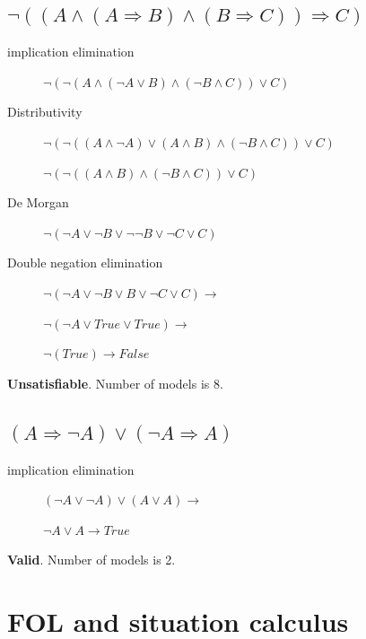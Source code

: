 \documentclass{article}                     %
\newcommand{\nt}[1]{\neg #1}
\begin{document}
	\subsection{$ \neg ((A \land (A \Rightarrow B) \land (B \Rightarrow C)) \Rightarrow C )$}
	\begin{description}
		\item[implication elimination] 	$ \neg (\neg(A \land (\nt{A} \lor B) \land (\nt{B} \land C)) \lor C )$
		\item[Distributivity]  $ \neg (\neg((A \land \nt{A}) \lor (A \land B) \land (\nt{B} \land C)) \lor C )$
		
		$ \neg (\neg((A \land B) \land (\nt{B} \land C)) \lor C )$
		\item[De Morgan] 		$ \neg (\nt{A} \lor \nt{B} \lor \nt{\nt{B}} \lor \nt{C} \lor C )$
		\item[Double negation elimination] $ \neg (\nt{A} \lor \nt{B} \lor B \lor \nt{C} \lor C ) \rightarrow $
		
		$ \neg (\nt{A} \lor True \lor True ) \rightarrow$
		
		$ \neg (True) \rightarrow False$
	\end{description}

	\textbf{Unsatisfiable}.  Number of models is 8.
	
	\subsection{$ (A\Rightarrow \nt{A}) \lor (\nt{A} \Rightarrow A) $}
		\begin{description}
		\item[implication elimination] $ (\nt{A} \lor \nt{A}) \lor (A \lor A) \rightarrow $
		
		$ \nt{A} \lor A \rightarrow True$
		
	\end{description}

	\textbf{Valid}.  Number of models is 2.
	
	
	\section{FOL and situation calculus}
	
	
	
	

	
\end{document}
